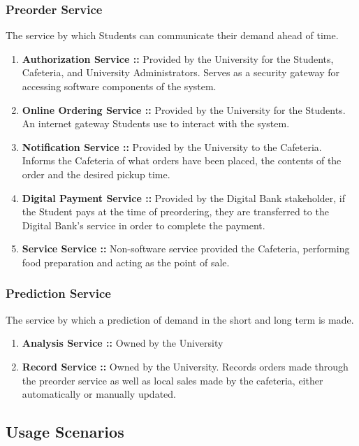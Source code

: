 \documentclass[11pt]{article}
\begin{document}
\subsubsection{Preorder Service}
\label{sec:org35d391e}
The service by which Students can communicate their demand ahead
of time.
\begin{enumerate}
\item \textbf{Authorization Service ::}
\label{sec:org5aa266d}
Provided by the University for the Students, Cafeteria, and
University Administrators. Serves as a security gateway for
accessing software components of the system.
\item \textbf{Online Ordering Service ::}
\label{sec:org339dedf}
Provided by the University for the Students. An internet gateway
Students use to interact with the system.
\item \textbf{Notification Service ::}
\label{sec:org4dbb3cc}
Provided by the University to the Cafeteria. Informs the
Cafeteria of what orders have been placed, the contents of the
order and the desired pickup time.
\item \textbf{Digital Payment Service ::}
\label{sec:org429fd58}
Provided by the Digital Bank stakeholder, if the Student pays at
the time of preordering, they are transferred to the Digital
Bank's service in order to complete the payment.
\item \textbf{Service Service ::}
\label{sec:orgf215de6}
Non-software service provided the Cafeteria, performing food
preparation and acting as the point of sale.
\end{enumerate}
\subsubsection{Prediction Service}
\label{sec:org4d46ec9}
The service by which a prediction of demand in the short and long
term is made.
\begin{enumerate}
\item \textbf{Analysis Service ::}
\label{sec:org4d76ca1}
Owned by the University
\item \textbf{Record Service ::}
\label{sec:orgb215e4c}
Owned by the University. Records orders made through the preorder
service as well as local sales made by the cafeteria, either
automatically or manually updated.
\end{enumerate}
\subsection{Usage Scenarios}
\label{sec:org06b632e}
\end{document}
